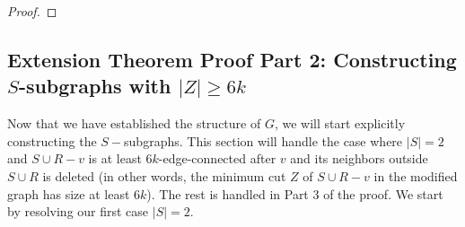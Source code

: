 \documentclass{article}
\begin{document}
\begin{proof}

\end{proof}

\subsection{Extension Theorem Proof Part 2: Constructing $S$-subgraphs with $|Z| \geq 6k$}

Now that we have established the structure of $G$, we will start explicitly constructing the $S-$subgraphs. This section will handle the case where $|S|=2$ and $S \cup R-v$ is at least $6k$-edge-connected after $v$ and its neighbors outside $S \cup R$ is deleted (in other words, the minimum cut $Z$ of $S \cup R-v$ in the modified graph has size at least $6k$). The rest is handled in Part 3 of the proof. We start by resolving our first case $|S|=2$.
\end{document}
